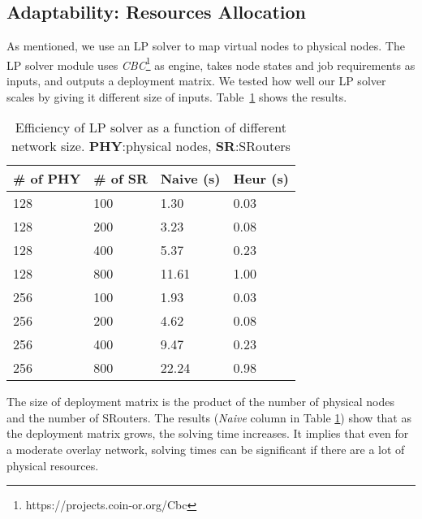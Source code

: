 \documentclass[conference]{IEEEtran}
\begin{document}
\subsection{Adaptability: Resources Allocation}
\label{sec:evaluation:smart}

As mentioned, we use an LP solver to map virtual nodes to physical
nodes.
The LP solver module uses
\textit{CBC}\footnote{https://projects.coin-or.org/Cbc} as engine,
takes node states and job requirements as inputs, and outputs a
deployment matrix.
We tested how well our LP solver scales by giving it different size of
inputs. Table~\ref{sec:evaluation:tab:lpsolver} shows the results.

\begin{table}[!tb]
  \begin{tabular}{ | p{1.6cm} | p{1.6cm} | p{1.6cm} | p{1.6cm} | }
    \hline
    \# of PHY & \# of SR & Naive (s) & Heur (s) \\
    \hline
    128 & 100 & 1.30 & 0.03 \\
    \hline
    128 & 200 & 3.23 & 0.08 \\
    \hline
    128 & 400 & 5.37 & 0.23 \\
    \hline
    128 & 800 & 11.61 & 1.00 \\
    \hline
    \hline
    256 & 100 & 1.93 & 0.03 \\
    \hline
    256 & 200 & 4.62 & 0.08 \\
    \hline
    256 & 400 & 9.47  & 0.23 \\
    \hline
    256 & 800 & 22.24 & 0.98 \\
    \hline
  \end{tabular}
  \caption{Efficiency of LP solver as a function of different network size. \textbf{PHY}:physical nodes, \textbf{SR}:SRouters}
  \label{sec:evaluation:tab:lpsolver}
  \vskip -5mm
\end{table}

The size of deployment matrix is the product of the number of physical
nodes and the number of SRouters.  The results (\textit{Naive} column
in Table \ref{sec:evaluation:tab:lpsolver}) show that as the
deployment matrix grows, the solving time increases.  It implies that
even for a moderate overlay network, solving times can be significant
if there are a lot of physical resources.
\end{document}
